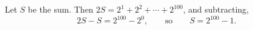 Let $S$ be the sum. Then $2S=2^1+2^2+\cdots+2^{100}$, and subtracting,
\[
2S-S=2^{100}-2^0,\qquad\text{so}\qquad S=\boxed{2^{100}-1}.
\]
